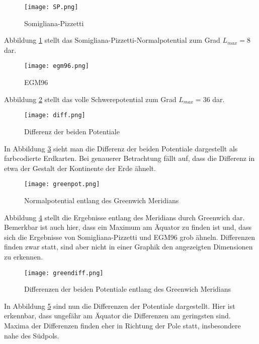 \begin{enumerate}
\begin{figure}[H]
	\centering
	\texttt{[image: SP.png]}
	\caption{Somigliana-Pizzetti}
	\label{sp}
\end{figure}

Abbildung \ref{sp} stellt das Somigliana-Pizzetti-Normalpotential zum Grad $L_{max}=8$ dar.

\begin{figure}[H]
	\centering
	\texttt{[image: egm96.png]}
	\caption{EGM96}
	\label{egm96}
\end{figure}

Abbildung \ref{egm96} stellt das volle Schwerepotential zum Grad $L_{max}=36$ dar.

\begin{figure}[H]
	\centering
	\texttt{[image: diff.png]}
	\caption{Differenz der beiden Potentiale}
	\label{diff}
\end{figure}

In Abbildung \ref{diff} sieht man die Differenz der beiden Potentiale dargestellt als farbcodierte Erdkarten. Bei genauerer Betrachtung fällt auf, dass die Differenz in etwa der Gestalt der Kontinente der Erde ähnelt. 

\begin{figure}[H]
	\centering
	\texttt{[image: greenpot.png]}
	\caption{Normalpotential entlang des Greenwich Meridians}
	\label{greenpot}
\end{figure}

Abbildung \ref{greenpot} stellt die Ergebnisse entlang des Meridians durch Greenwich dar. Bemerkbar ist auch hier, dass ein Maximum am Äquator zu finden ist und, dass sich die Ergebnisse von Somigliana-Pizzetti und EGM96 grob ähneln. Differenzen finden zwar statt, sind aber nicht in einer Graphik den angezeigten Dimensionen zu erkennen. 

\begin{figure}[H]
	\centering
	\texttt{[image: greendiff.png]}
	\caption{Differenzen der beiden Potentiale entlang des Greenwich Meridians}
	\label{greendiff}
\end{figure}

In Abbildung \ref{greendiff} sind nun die Differenzen der Potentiale dargestellt. Hier ist erkennbar, dass ungefähr am Äquator die Differenzen am geringsten sind. Maxima der Differenzen finden eher in Richtung der Pole statt, insbesondere nahe des Südpols. 

 
\end{enumerate}
